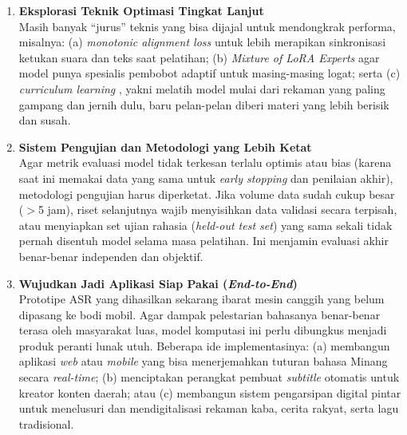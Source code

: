 \begin{enumerate}
    \item \textbf{Eksplorasi Teknik Optimasi Tingkat Lanjut} \\
    Masih banyak ``jurus'' teknis yang bisa dijajal untuk mendongkrak performa, misalnya: (a) \textit{monotonic alignment loss} \cite{zhuang2025monotonic} untuk lebih merapikan sinkronisasi ketukan suara dan teks saat pelatihan; (b) \textit{Mixture of LoRA Experts} \cite{bagat2025mixture} agar model punya spesialis pembobot adaptif untuk masing-masing logat; serta (c) \textit{curriculum learning} \cite{liang2025fieldmatters}, yakni melatih model mulai dari rekaman yang paling gampang dan jernih dulu, baru pelan-pelan diberi materi yang lebih berisik dan susah.

    \item \textbf{Sistem Pengujian dan Metodologi yang Lebih Ketat} \\
    Agar metrik evaluasi model tidak terkesan terlalu optimis atau bias (karena saat ini memakai data yang sama untuk \textit{early stopping} dan penilaian akhir), metodologi pengujian harus diperketat. Jika volume data sudah cukup besar ($>$5 jam), riset selanjutnya wajib menyisihkan data validasi secara terpisah, atau menyiapkan set ujian rahasia (\textit{held-out test set}) yang sama sekali tidak pernah disentuh model selama masa pelatihan. Ini menjamin evaluasi akhir benar-benar independen dan objektif.

    \item \textbf{Wujudkan Jadi Aplikasi Siap Pakai (\textit{End-to-End})} \\
    Prototipe ASR yang dihasilkan sekarang ibarat mesin canggih yang belum dipasang ke bodi mobil. Agar dampak pelestarian bahasanya benar-benar terasa oleh masyarakat luas, model komputasi ini perlu dibungkus menjadi produk peranti lunak utuh. Beberapa ide implementasinya: (a) membangun aplikasi \textit{web} atau \textit{mobile} yang bisa menerjemahkan tuturan bahasa Minang secara \textit{real-time}; (b) menciptakan perangkat pembuat \textit{subtitle} otomatis untuk kreator konten daerah; atau (c) membangun sistem pengarsipan digital pintar untuk menelusuri dan mendigitalisasi rekaman kaba, cerita rakyat, serta lagu tradisional.

\end{enumerate}